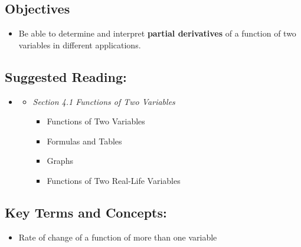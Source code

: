
\vspace{-0.25 in}
\begin{framed}
\subsection*{Objectives}
\begin{itemize}
    \item Be able to determine and interpret \textbf{partial derivatives} of a function of two variables in different applications.
    
\end{itemize}

\subsection*{Suggested Reading:}
\begin{itemize}
\item \cite{Calaway}\footnotemark[1]
   \begin{itemize}
        \item \emph{Section 4.1 Functions of Two Variables}
        \begin{itemize}
            \item Functions of Two Variables
            \item Formulas and Tables
            \item Graphs
            \item Functions of Two Real-Life Variables
        \end{itemize}
    \end{itemize}
\end{itemize}
\subsection*{Key Terms and Concepts:} 

\begin{multicols}{2}
\begin{itemize}
    \item Rate of change of a function of more than one variable
    
\end{itemize}
\end{multicols}
\end{framed}


